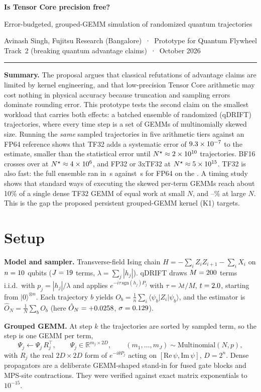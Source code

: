 \documentclass[10pt]{article}
\begin{document}
{\Large\bfseries Is Tensor Core precision free?\par}
{\large Error-budgeted, grouped-GEMM simulation of randomized quantum trajectories\par}
\vspace{3pt}
{\small Avinash Singh, Fujitsu Research (Bangalore) \,·\, Prototype for Quantum Flywheel Track~2 (breaking quantum advantage claims) \,·\, October 2026\par}
\vspace{2pt}\hrule\vspace{6pt}

\textbf{Summary.} The proposal argues that classical refutations of advantage claims are limited by kernel engineering, and that low-precision Tensor Core arithmetic may cost nothing in physical accuracy because truncation and sampling errors dominate rounding error. This prototype tests the second claim on the smallest workload that carries both effects: a batched ensemble of randomized (qDRIFT) trajectories, where every time step is a set of GEMMs of multinomially skewed size. Running the \emph{same} \Ntraj{} sampled trajectories in five arithmetic tiers against an FP64 reference shows that TF32 adds a systematic error of $9.3\times10^{-7}$ to the estimate, smaller than the statistical error until $N^\star\approx2\times10^{10}$ trajectories. BF16 crosses over at $N^\star\approx4\times10^{6}$, and FP32 or 3xTF32 at $N^\star\approx5\times10^{15}$. TF32 is also fast: the full ensemble ran in \TimeTf\,s against \TimeRef\,s for FP64 on the \Device. A timing study shows that standard ways of executing the skewed per-term GEMMs reach about 10\% of a single dense TF32 GEMM of equal work at small $N$, and \PadMinTf--\LoopMinTf\% at large $N$. This is the gap the proposed persistent grouped-GEMM kernel (K1) targets.

\section{Setup}
\textbf{Model and sampler.} Transverse-field Ising chain $H=-\sum_{i}Z_iZ_{i+1}-\sum_i X_i$ on $n=10$ qubits ($J=19$ terms, $\lambda=\sum_j|h_j|$). qDRIFT draws $M=200$ terms i.i.d.\ with $p_j=|h_j|/\lambda$ and applies $e^{-i\tau\,\mathrm{sgn}(h_j)P_j}$ with $\tau=\lambda t/M$, $t=2.0$, starting from $|0\rangle^{\otimes n}$. Each trajectory $b$ yields $O_b=\tfrac1n\sum_i\langle\psi_b|Z_i|\psi_b\rangle$, and the estimator is $\hat O_N=\tfrac1N\sum_b O_b$ (here $\hat O_N=+0.0258$, $\sigma=0.129$).

\textbf{Grouped GEMM.} At step $k$ the trajectories are sorted by sampled term, so the step is one GEMM per term,
\[
\Psi_j \leftarrow \Psi_j\,R_j^{\!\top},\qquad \Psi_j\in\mathbb R^{m_j\times 2D},\qquad (m_1,\dots,m_J)\sim\mathrm{Multinomial}(N,p),
\]
with $R_j$ the real $2D\times2D$ form of $e^{-i\theta P_j}$ acting on $[\mathrm{Re}\,\psi,\mathrm{Im}\,\psi]$, $D=2^n$. Dense propagators are a deliberate GEMM-shaped stand-in for fused gate blocks and MPS-site contractions. They were verified against exact matrix exponentials to $10^{-15}$.
\end{document}
